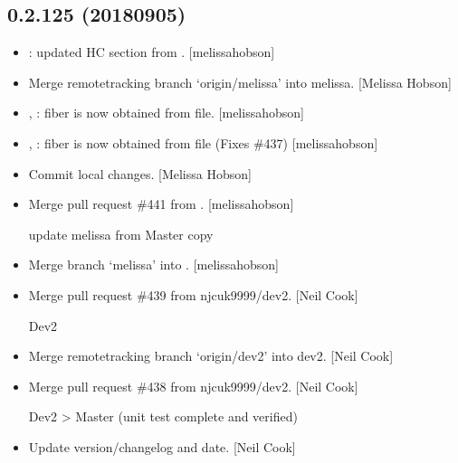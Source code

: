 \documentclass[a4paper,10pt,english]{report}
\begin{document}
\subsection{0.2.125 (2018\sphinxhyphen{}09\sphinxhyphen{}05)}
\label{\detokenize{misc/changelog:id356}}\begin{itemize}
\item {} 
: updated HC section from
. {[}melissa\sphinxhyphen{}hobson{]}

\item {} 
Merge remote\sphinxhyphen{}tracking branch ‘origin/melissa’ into melissa. {[}Melissa
Hobson{]}

\item {} 
, : fiber is now obtained from file.
{[}melissa\sphinxhyphen{}hobson{]}

\item {} 
, : fiber is now obtained from file
(Fixes \#437) {[}melissa\sphinxhyphen{}hobson{]}

\item {} 
Commit local changes. {[}Melissa Hobson{]}

\item {} 
Merge pull request \#441 from . {[}melissa\sphinxhyphen{}hobson{]}

update melissa from Master copy

\item {} 
Merge branch ‘melissa’ into . {[}melissa\sphinxhyphen{}hobson{]}

\item {} 
Merge pull request \#439 from njcuk9999/dev2. {[}Neil Cook{]}

Dev2

\item {} 
Merge remote\sphinxhyphen{}tracking branch ‘origin/dev2’ into dev2. {[}Neil Cook{]}

\item {} 
Merge pull request \#438 from njcuk9999/dev2. {[}Neil Cook{]}

Dev2 \textendash{}\textgreater{} Master (unit test complete and verified)

\item {} 
Update version/changelog and date. {[}Neil Cook{]}

\end{itemize}
\end{document}
